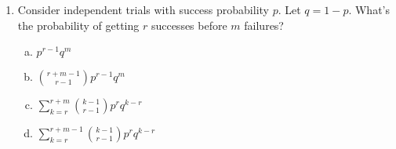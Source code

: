 \documentclass[11pt]{article}
\begin{document}
\begin{enumerate}
\item Consider independent trials with success probability $p$. Let $q = 1-p$.
What's the probability of getting $r$ successes before $m$ failures?

\begin{enumerate}[(a)]
\item $p^{r-1} q^m$
\item ${r + m -1 \choose r-1}p^{r-1} q^m$
\item $\sum_{k = r}^{r + m} {k -1 \choose r-1}p^r q^{k - r}$
\item  $\sum_{k = r}^{r + m-1} {k -1 \choose r-1}p^r q^{k - r}$
\end{enumerate}

\end{enumerate}
\end{document}
